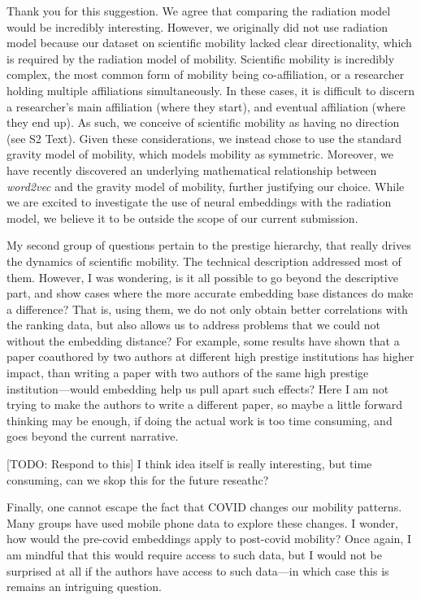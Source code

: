 \documentclass[12pt,a4paper]{article}
\newcommand{\todo}[1]{{\leavevmode\color{orange}[TODO: #1]}}
\newcommand{\response}[1]{{\leavevmode\noindent #1}}
\newcommand{\rcomment}[1]{%
\vspace{10pt}
\begin{tcolorbox}[colback=black!3,colframe=white!45!black]
#1
\end{tcolorbox}
}
\begin{document}
\response{

Thank you for this suggestion. 
We agree that comparing the radiation model would be incredibly interesting.
However, we originally did not use radiation model because our dataset on scientific mobility lacked clear directionality, which is required by the radiation model of mobility. 
Scientific mobility is incredibly complex, the most common form of mobility being co-affiliation, or a researcher holding multiple affiliations simultaneously. 
In these cases, it is difficult to discern a researcher's main affiliation (where they start), and eventual affiliation (where they end up).
As such, we conceive of scientific mobility as having no direction (see S2 Text). 
Given these considerations, we instead chose to use the standard gravity model of mobility, which models mobility as symmetric.
Moreover, we have recently discovered an underlying mathematical relationship between \textit{word2vec} and the gravity model of mobility, further justifying our choice. 
While we are excited to investigate the use of neural embeddings with the radiation model, we believe it to be outside the scope of our current submission. 
}

\rcomment{
  My second group of questions pertain to the prestige hierarchy, that really drives the dynamics of scientific mobility. The technical description addressed most of them. However, I was wondering, is it all possible to go beyond the descriptive part, and show cases where the more accurate embedding base distances do make a difference? That is, using them, we do not only obtain better correlations with the ranking data, but also allows us to address problems that we could not without the embedding distance? For example, some results have shown that a paper coauthored by two authors at different high prestige institutions has higher impact, than writing a paper with two authors of the same high prestige institution—would embedding help us pull apart such effects? Here I am not trying to make the authors to write a different paper, so maybe a little forward thinking may be enough, if doing the actual work is too time consuming, and goes beyond the current narrative.
}

\response{
\todo{Respond to this}
 	I think idea itself is really interesting, but time consuming, can we skop this for the future reseathc?

}


\rcomment{
Finally, one cannot escape the fact that COVID changes our mobility patterns. Many groups have used mobile phone data to explore these changes. I wonder, how would the pre-covid embeddings apply to post-covid mobility? Once again, I am mindful that this would require access to such data, but I would not be surprised at all if the authors have access to such data—in which case this is remains an intriguing question.
}
\end{document}
